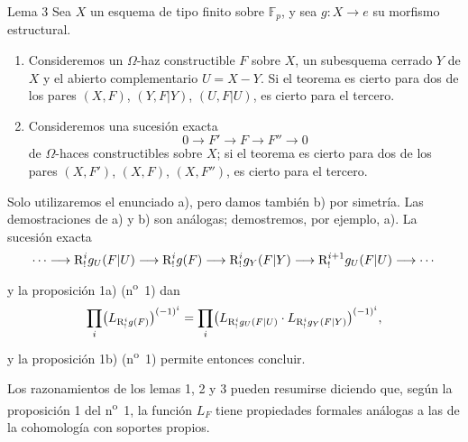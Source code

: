 \begin{statement}{Lema 3}
Sea $X$ un esquema de tipo finito sobre $\mathbb F_p$, y sea $g:X\to e$ su morfismo estructural.
\begin{enumerate}[label=\alph*)]
\item Consideremos un $\Omega$-haz constructible $F$ sobre $X$, un subesquema cerrado $Y$ de $X$ y el abierto complementario $U=X-Y$. Si el teorema es cierto para dos de los pares $(X,F)$, $(Y,F|Y)$, $(U,F|U)$, es cierto para el tercero.
\item Consideremos una sucesión exacta
\[
0\longrightarrow F'\longrightarrow F\longrightarrow F''\longrightarrow0
\]
de $\Omega$-haces constructibles sobre $X$; si el teorema es cierto para dos de los pares $(X,F')$, $(X,F)$, $(X,F'')$, es cierto para el tercero.
\end{enumerate}
\end{statement}

Solo utilizaremos el enunciado a), pero damos también b) por simetría. Las demostraciones de a) y b) son análogas; demostremos, por ejemplo, a). La sucesión exacta
\[
\cdots\longrightarrow \mathrm{R}^i_!g_U(F|U)\longrightarrow \mathrm{R}^i_!g(F)
\longrightarrow \mathrm{R}^i_!g_Y(F|Y)\longrightarrow \mathrm{R}^{i+1}_!g_U(F|U)\longrightarrow\cdots
\]
y la proposición 1a) (n\textsuperscript{o}~1) dan
\[
\prod_i\bigl(L_{\mathrm{R}^i_!g(F)}\bigr)^{(-1)^i}
=\prod_i\bigl(L_{\mathrm{R}^i_!g_U(F|U)}\cdot L_{\mathrm{R}^i_!g_Y(F|Y)}\bigr)^{(-1)^i},
\]
y la proposición 1b) (n\textsuperscript{o}~1) permite entonces concluir.

Los razonamientos de los lemas 1, 2 y 3 pueden resumirse diciendo que, según la proposición 1 del n\textsuperscript{o}~1, la función $L_F$ tiene propiedades formales análogas a las de la cohomología con soportes propios.
